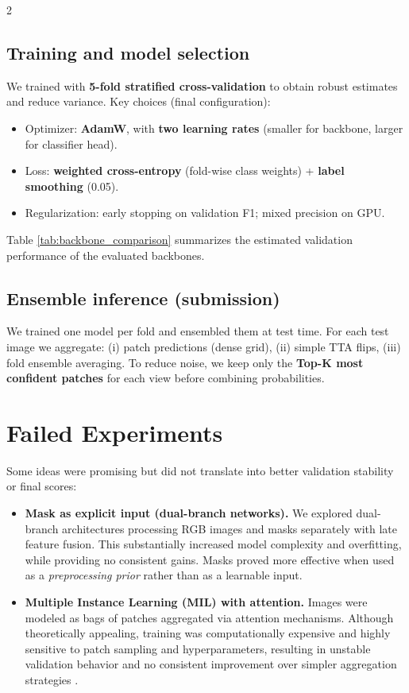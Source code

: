 \documentclass[11pt]{article}
\begin{document}
\begin{multicols}{2}
\subsection{Training and model selection}
We trained with \textbf{5-fold stratified cross-validation} to obtain robust estimates and reduce variance. Key choices (final configuration):
\begin{itemize}%
    \item Optimizer: \textbf{AdamW}, with \textbf{two learning rates} (smaller for backbone, larger for classifier head).
    \item Loss: \textbf{weighted cross-entropy} (fold-wise class weights) + \textbf{label smoothing} (0.05). \cite{szegedy2016rethinking}
    \item Regularization: early stopping on validation F1; mixed precision on GPU.
\end{itemize}
Table \ref{tab:backbone_comparison} summarizes the estimated validation performance of the evaluated backbones.
\vspace{-0.6em}

\subsection{Ensemble inference (submission)}
We trained one model per fold and ensembled them at test time.
For each test image we aggregate: (i) patch predictions (dense grid), (ii) simple TTA flips, (iii) fold ensemble averaging.
To reduce noise, we keep only the \textbf{Top-K most confident patches} for each view before combining probabilities.


\section{Failed Experiments}
Some ideas were promising but did not translate into better validation stability or final scores:

\begin{itemize}[leftmargin=*, itemsep=2pt]
    \item \textbf{Mask as explicit input (dual-branch networks).}
    We explored dual-branch architectures processing RGB images and masks separately with late feature fusion.
    This substantially increased model complexity and overfitting, while providing no consistent gains.
    Masks proved more effective when used as a \emph{preprocessing prior} rather than as a learnable input.

    \item \textbf{Multiple Instance Learning (MIL) with attention.}
    Images were modeled as bags of patches aggregated via attention mechanisms.
    Although theoretically appealing, training was computationally expensive and highly sensitive to patch sampling and hyperparameters, resulting in unstable validation behavior and no consistent improvement over simpler aggregation strategies \cite{ilse2018attention}.


\end{itemize}
\end{multicols}
\end{document}
